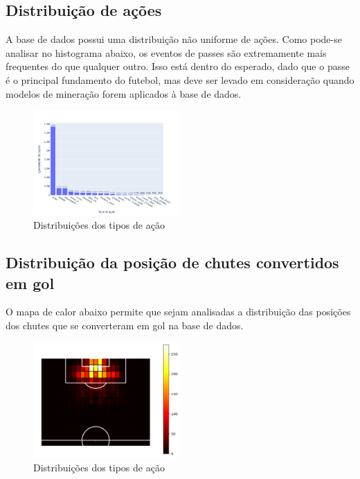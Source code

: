 \documentclass{article}
\begin{document}
\subsection{Distribuição de ações}

A base de dados possui uma distribuição não uniforme de ações. Como pode-se
analisar no histograma abaixo, os eventos de passes são extremamente mais
frequentes do que qualquer outro. Isso está dentro do esperado, dado que o
passe é o principal fundamento do futebol, mas deve ser levado em consideração
quando modelos de mineração forem aplicados à base de dados.

\begin{figure}[H]
	\centering
	\includegraphics[width=0.5\textwidth]{images/action_distribution.png}
	\caption{Distribuições dos tipos de ação}
	\label{fig:action_distribution}
\end{figure}

\subsection{Distribuição da posição de chutes convertidos em gol}

O mapa de calor abaixo permite que sejam analisadas a distribuição das posições
dos chutes que se converteram em gol
na base de dados.

\begin{figure}[H]
	\centering
	\includegraphics[width=0.5\textwidth]{images/goal_position_heatmap.png}
	\caption{Distribuições dos tipos de ação}
	\label{fig:heatmap_goals}
\end{figure}
\end{document}
